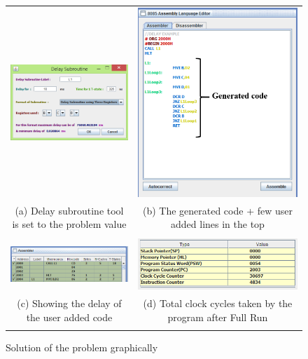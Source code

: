 \begin{figure}[htbp]
	\centering
	\begin{tabular}{cc}
		\includegraphics[width=0.5\linewidth]{delay_sub_filled_form} &		\includegraphics[width=0.5\linewidth]{delay_sub_assembler_editor}\\
		(a) Delay subroutine tool is set to the problem value & (b) The generated code + few user added lines in the top\\\\
		\includegraphics[width=0.5\linewidth]{delay_sub_compiled} & \includegraphics[width=0.5\linewidth]{delay_sub_calc}\\
		(c) Showing the delay of the user added code & (d) Total clock cycles taken by the program after Full Run \\\\
	\end{tabular}
	\caption{Solution of the problem graphically}
	\label{fig:delay_sub}
\end{figure}

